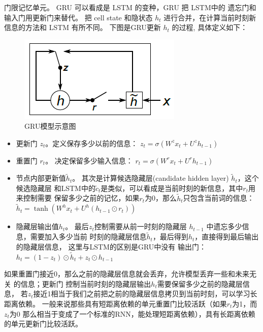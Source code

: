 {门限记忆单元。} GRU 可以看成是 LSTM 的变种，GRU 把 LSTM中的 遗忘门和输入门用更新门来替代。 把 cell state 和隐状态 $h_t$ 进行合并，在计算当前时刻新信息的方法和 LSTM 有所不同。 下图是GRU更新 $h_t$ 的过程, 具体定义如下：
\begin{figure}[!h]
  \centering
  \includegraphics[width=0.45\linewidth]{./figures/gru.png}
  \caption{GRU模型示意图}\label{fig:gru}
\end{figure}

\begin{itemize}
\item 更新门 $z_t$。定义保存多少以前的信息： $z_t = \sigma ( W^z x_t+ U^z h_{t-1}  )$

\item 重置门 $r_t$。 决定保留多少输入信息： $r_t = \sigma(W^r x_t  + U^r h_{t-1}  )$

\item 节点内部更新值$\tilde h_t $。 其次是计算候选隐藏层(candidate hidden layer) $\tilde h_t$，这个候选隐藏层 和LSTM中的$\tilde c_t$是类似，可以看成是当前时刻的新信息，其中$r_t$用来控制需要 保留多少之前的记忆，如果$r_t$为0，那么$\tilde h_t$只包含当前词的信息：$\tilde h_t  = \tanh (W^h x_t  + U^h(h_{t-1} \odot r_t) )$

\item 隐藏层输出值$h_t$。 最后$z_t$控制需要从前一时刻的隐藏层 $h_{t-1}$ 中遗忘多少信息，需要加入多少当前 时刻的隐藏层信息$\tilde h_t$，最后得到$h_t$，直接得到最后输出的隐藏层信息， 这里与LSTM的区别是GRU中没有 输出门：$h_t = (1-z_t)\odot \tilde h_t  + z_t \odot h_{t-1}$
\end{itemize}

如果重置门接近0，那么之前的隐藏层信息就会丢弃，允许模型丢弃一些和未来无关 的信息；更新门 控制当前时刻的隐藏层输出$h_t$需要保留多少之前的隐藏层信息， 若$z_t$接近1相当于我们之前把之前的隐藏层信息拷贝到当前时刻，可以学习长距离依赖。 一般来说那些具有短距离依赖的单元重置门比较活跃（如果$r_t$为1，而$z_t$为$0$ 那么相当于变成了一个标准的RNN，能处理短距离依赖），具有长距离依赖的单元更新门比较活跃。



